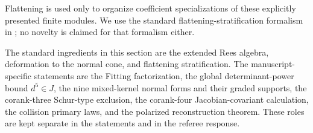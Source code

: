 Flattening is used only to organize coefficient specializations of
these explicitly presented finite modules.  We use the standard
flattening-stratification formalism in
\cite[Tag 052F]{StacksFlattening}; no novelty is claimed for that
formalism either.

\begin{remark}
The standard ingredients in this section are the extended Rees
algebra, deformation to the normal cone, and flattening
stratification.  The manuscript-specific statements are the Fitting
factorization, the global determinant-power bound \(d^5\in J\), the
nine mixed-kernel normal forms and their graded supports, the
corank-three Schur-type exclusion, the corank-four
Jacobian-covariant calculation, the collision primary laws, and the
polarized reconstruction theorem.  These roles are kept separate in
the statements and in the referee response.
\end{remark}
